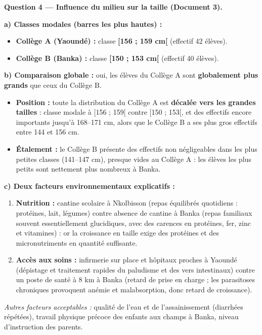 \documentclass[11pt]{article}
\begin{document}
\begin{exoresolu}
\medskip
\textbf{Question 4 — Influence du milieu sur la taille (Document 3).}
\par
\textbf{a) Classes modales (barres les plus hautes) :}
\begin{itemize}
    \item \textbf{Collège A (Yaoundé) :} classe \textbf{[156 ; 159 cm[} (effectif 42 élèves).
    \item \textbf{Collège B (Banka) :} classe \textbf{[150 ; 153 cm[} (effectif 40 élèves).
\end{itemize}
\par
\textbf{b) Comparaison globale :} oui, les élèves du Collège A sont \textbf{globalement plus grands} que ceux du Collège B.
\begin{itemize}
    \item \textbf{Position :} toute la distribution du Collège A est \textbf{décalée vers les grandes tailles} : classe modale à [156 ; 159[ contre [150 ; 153[, et des effectifs encore importants jusqu'à 168--171 cm, alors que le Collège B a ses plus gros effectifs entre 144 et 156 cm.
    \item \textbf{Étalement :} le Collège B présente des effectifs non négligeables dans les plus petites classes (141--147 cm), presque vides au Collège A : les élèves les plus petits sont nettement plus nombreux à Banka.
\end{itemize}
\par
\textbf{c) Deux facteurs environnementaux explicatifs :}
\begin{enumerate}
    \item \textbf{Nutrition :} cantine scolaire à Nkolbisson (repas équilibrés quotidiens : protéines, lait, légumes) contre absence de cantine à Banka (repas familiaux souvent essentiellement glucidiques, avec des carences en protéines, fer, zinc et vitamines) : or la croissance en taille exige des protéines et des micronutriments en quantité suffisante.
    \item \textbf{Accès aux soins :} infirmerie sur place et hôpitaux proches à Yaoundé (dépistage et traitement rapides du paludisme et des vers intestinaux) contre un poste de santé à 8 km à Banka (retard de prise en charge ; les parasitoses chroniques provoquent anémie et malabsorption, donc retard de croissance).
\end{enumerate}
\emph{Autres facteurs acceptables :} qualité de l'eau et de l'assainissement (diarrhées répétées), travail physique précoce des enfants aux champs à Banka, niveau d'instruction des parents.


\end{exoresolu}
\end{document}
